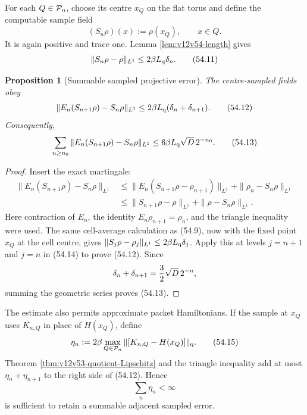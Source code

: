\documentclass[11pt]{article}
\newtheorem{proposition}[theorem]{Proposition}
\theoremstyle{remark}
\begin{document}
For each \(Q\in{\cal P}_n\), choose its centre \(x_Q\) on the flat
torus and define the computable sample field
\begin{equation}
 (S_n\rho)(x):=\rho(x_Q),\qquad x\in Q.            \tag{54.10}
\end{equation}
It is again positive and trace one.  Lemma
\ref{lem:v12v54-length} gives
\begin{equation}
 \|S_n\rho-\rho\|_{L^1}
 \leq2\beta L_{\rm q}\delta_n.                    \tag{54.11}
\end{equation}

\begin{proposition}[Summable sampled projective error]
\label{prop:v12v54-sampled}
The centre-sampled fields obey
\begin{equation}
 \|E_n(S_{n+1}\rho)-S_n\rho\|_{L^1}
 \leq
 2\beta L_{\rm q}(\delta_n+\delta_{n+1}).         \tag{54.12}
\end{equation}
Consequently,
\begin{equation}
 \sum_{n\geq n_0}
 \|E_n(S_{n+1}\rho)-S_n\rho\|_{L^1}
 \leq
 6\beta L_{\rm q}\sqrt D\,2^{-n_0}.               \tag{54.13}
\end{equation}
\end{proposition}

\begin{proof}
Insert the exact martingale:
\begin{align}
 \|E_n(S_{n+1}\rho)-S_n\rho\|_{L^1}
 &\leq
 \|E_n(S_{n+1}\rho-\rho_{n+1})\|_{L^1}
 +\|\rho_n-S_n\rho\|_{L^1}                       \nonumber\\
 &\leq
 \|S_{n+1}\rho-\rho\|_{L^1}
 +\|\rho-S_n\rho\|_{L^1}.                         \tag{54.14}
\end{align}
Here contraction of \(E_n\), the identity
\(E_n\rho_{n+1}=\rho_n\), and the triangle inequality were used.
The same cell-average calculation as (54.9), now with the fixed
point \(x_Q\) at the cell centre, gives
\(\|S_j\rho-\rho_j\|_{L^1}\leq
2\beta L_{\rm q}\delta_j\).  Apply this at levels \(j=n+1\) and
\(j=n\) in (54.14) to prove (54.12).
Since
\[
 \delta_n+\delta_{n+1}
 ={3\over2}\sqrt D\,2^{-n},
\]
summing the geometric series proves (54.13).
\end{proof}

The estimate also permits approximate packet Hamiltonians.  If the
sample at \(x_Q\) uses \(K_{n,Q}\) in place of \(H(x_Q)\), define
\begin{equation}
 \eta_n
 :=
 2\beta\max_{Q\in{\cal P}_n}
 \|[K_{n,Q}-H(x_Q)]\|_{\rm q}.                   \tag{54.15}
\end{equation}
Theorem \ref{thm:v12v53-quotient-Lipschitz} and the triangle
inequality add at most \(\eta_n+\eta_{n+1}\) to the right side of
(54.12).  Hence
\begin{equation}
 \sum_n\eta_n<\infty                              \tag{54.16}
\end{equation}
is sufficient to retain a summable adjacent sampled error.
\end{document}
